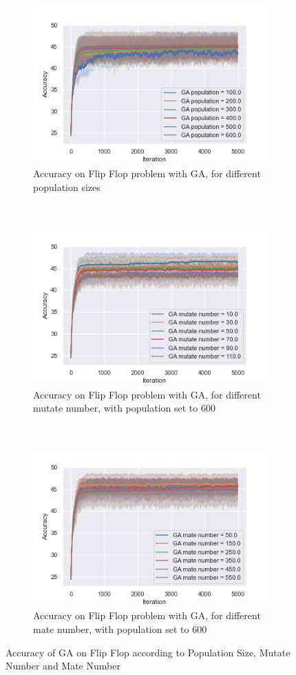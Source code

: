 \documentclass[twocolumn, 10pt]{article}
\begin{document}
				\begin{figure}[h]
					\centering
					\begin{subfigure}[t]{\columnwidth}
						\centering
						\includegraphics[width=0.68\linewidth]{../graphics/flip_flop_GA_Iteration_Error_GA_population.png}
						\caption{Accuracy on Flip Flop problem with GA, for different population sizes}
						\label{ff:ga_pop}
					\end{subfigure}
					~
					\begin{subfigure}[t]{\columnwidth}
						\centering
						\includegraphics[width=0.68\linewidth]{../graphics/flip_flop_GA_Iteration_Error_GA_mutate_number.png}
						\caption{Accuracy on Flip Flop problem with GA, for different mutate number, with population set to 600}
						\label{ff:ga_mutate}
					\end{subfigure}
					~
					\begin{subfigure}[t]{\columnwidth}
						\centering
						\includegraphics[width=0.68\linewidth]{../graphics/flip_flop_GA_Iteration_Error_GA_mate_number.png}
						\caption{Accuracy on Flip Flop problem with GA, for different mate number, with population set to 600}
						\label{ff:ga_mate}
					\end{subfigure}
					\caption{Accuracy of GA on Flip Flop according to Population Size, Mutate Number and Mate Number}
					\label{ff:ga}
				\end{figure}
\end{document}
